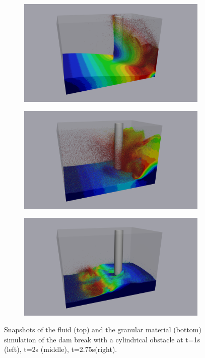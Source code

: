 \begin{figure}[H]
	\begin{subfigure}{0.325 \textwidth}	
		\centering
		\includegraphics[width=1.0\textwidth]{images/CFD_DEM/lgran20.png}
	\end{subfigure}
	\begin{subfigure}{0.325 \textwidth}
		\centering
		\includegraphics[width=1.0\textwidth]{images/CFD_DEM/lgran40.png}
	\end{subfigure}	
	\begin{subfigure}{0.325 \textwidth}
		\centering
		\includegraphics[width=1.0\textwidth]{images/CFD_DEM/lgran55.png}
	\end{subfigure}
	\caption{Snapshots of the fluid (top) and the granular material (bottom) simulation of the dam break with a cylindrical obstacle at t=1\si{s} (left), t=2\si{s} (middle), t=2.75\si{s}(right).}	\label{fig:db_obstacle_2}
\end{figure}
